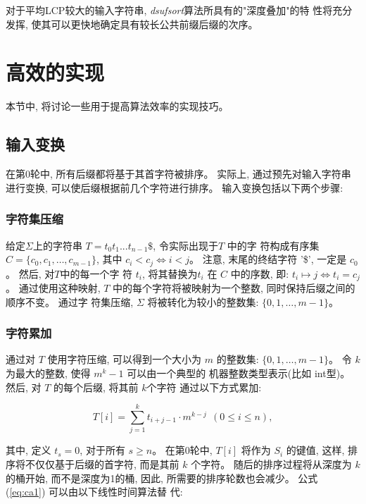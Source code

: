 对于平均LCP较大的输入字符串, \emph{dsufsort}算法所具有的"深度叠加"的特
性将充分发挥, 使其可以更快地确定具有较长公共前缀后缀的次序。


\section{高效的实现}

本节中, 将讨论一些用于提高算法效率的实现技巧。

\subsection{输入变换}

在第0轮中, 所有后缀都将基于其首字符被排序。 实际上, 通过预先对输入字符串
进行变换, 可以使后缀根据前几个字符进行排序。 输入变换包括以下两个步骤:

\subsubsection{字符集压缩}

给定$\Sigma$上的字符串 $T = t_0t_1...t_{n-1}\$$, 令实际出现于$T$ 中的字
符构成有序集 $C = \{c_0, c_1,\dots, c_{m-1}\}$, 其中 $c_i < c_j \iff i
< j$。 注意, 末尾的终结字符 '\$', 一定是 $c_0$。 然后, 对$T$中的每一个字
符 $t_i$, 将其替换为$t_i$ 在 $C$ 中的序数, 即: $t_i \mapsto j \iff t_i
= c_j$。 通过使用这种映射,
$T$ 中的每个字符将被映射为一个整数, 同时保持后缀之间的顺序不变。 通过字
符集压缩, $\Sigma$ 将被转化为较小的整数集: $\{0,1,\dots,m-1\}$。

\subsubsection{字符累加}

通过对 $T$ 使用字符压缩, 可以得到一个大小为 $m$ 的整数集:
$\{0,1,\dots,m-1\}$。 令 $k$ 为最大的整数, 使得 $m^k-1$ 可以由一个典型的
机器整数类型表示(比如 int型)。 然后, 对 $T$ 的每个后缀, 将其前 $k$个字符
通过以下方式累加:

\begin{equation}\label{eq:ca1}
  T[i] = \sum_{j=1}^k t_{i+j-1} \cdot m^{k-j}  ~~(0 \leq i \leq n),
\end{equation}

\noindent 其中, 定义 $t_s = 0$, 对于所有 $s \geq n$。 在第0轮中, $T[i]$
将作为 $S_i$ 的键值, 这样, 排序将不仅仅基于后缀的首字符, 而是其前 $k$
个字符。 随后的排序过程将从深度为 $k$的桶开始, 而不是深度为1的桶, 因此,
所需要的排序轮数也会减少。 公式 (\ref{eq:ca1}) 可以由以下线性时间算法替
代:


